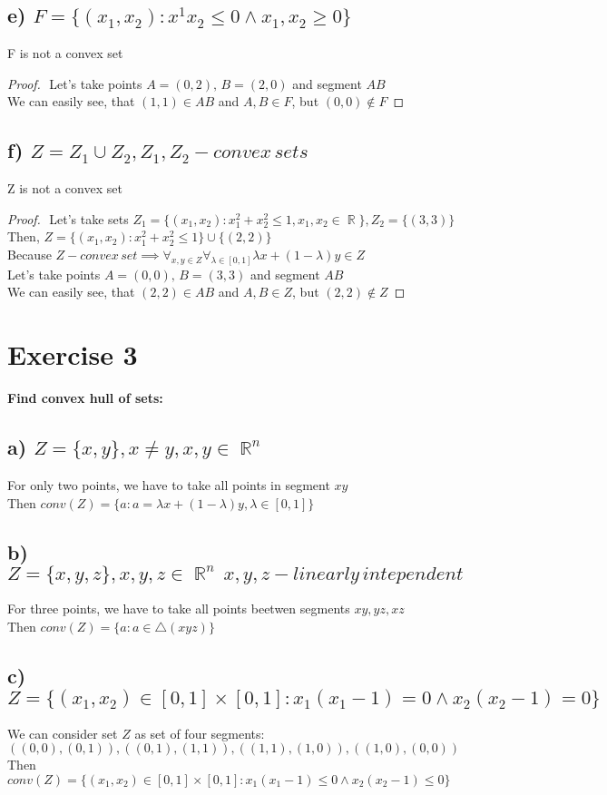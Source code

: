 \documentclass[12pt]{article}
\DeclareMathOperator{\R}{\mathbb{R}}
\begin{document}
\subsection*{e) \( F=\{(x_1, x_2):x^1 x_2\leq 0 \land x_1, x_2\geq 0\}\)}
F is not a convex set
\begin{proof}
    $ $\newline
    Let's take points \(A=(0,2), \, B=(2,0)\) and segment \(AB\)\\
    We can easily see, that \((1,1) \in AB\) and \( A, B \in F\), but \( (0,0)\notin F\)
\end{proof}
\subsection*{f) \(Z=Z_1 \cup Z_2, Z_1, Z_2-convex\,sets\)}
Z is not a convex set
\begin{proof}
    $ $\newline
    Let's take sets \( Z_1=\{(x_1, x_2):x_1^2+x_2^2\leq 1, x_1, x_2 \in \R\}, Z_2=\{(3, 3)\} \)\\
    Then, \(Z=\{(x_1, x_2):x_1^2+x_2^2\leq 1\}\cup \{(2, 2)\}\)\\
    Because \(Z-convex\,set \implies \forall_{x, y \in Z} \forall_{\lambda \in [0,1]} \lambda x+(1-\lambda)y \in Z\)\\
    Let's take points \(A=(0,0), \, B=(3, 3)\) and segment \(AB\)\\
    We can easily see, that \((2,2) \in AB\) and \( A, B \in Z\), but \( (2,2)\notin Z\)
\end{proof}
\section*{Exercise 3}
{\bfseries Find convex hull of sets:}
\subsection*{a) \( Z=\{x, y\}, x \neq y, x,y \in \R^n\)}
For only two points, we have to take all points in segment \(xy\)\\
Then \(conv(Z) = \{ a:a=\lambda x + (1-\lambda)y, \lambda \in [0,1]\}\)
\subsection*{b) \( Z=\{x, y, z\}, x,y,z \in \R^n\, x, y, z - linearly\,intependent\)}
For three points, we have to take all points beetwen segments \(xy, yz, xz\)\\
Then \(conv(Z) = \{ a: a \in \bigtriangleup(xyz) \}\)
\subsection*{c) \( Z=\{(x_1, x_2) \in [0,1] \times [0,1]: x_1(x_1 - 1)=0 \land x_2(x_2 - 1)=0 \}\)}
We can consider set \(Z\) as set of four segments: \\ \( ((0,0), (0,1)), ((0,1), (1,1)), ((1,1), (1,0)), ((1,0), (0,0)) \)\\
Then \( conv(Z)= \{(x_1, x_2) \in [0,1] \times [0,1]: x_1(x_1 - 1) \leq 0 \land x_2(x_2 - 1) \leq 0 \}\)
\end{document}
